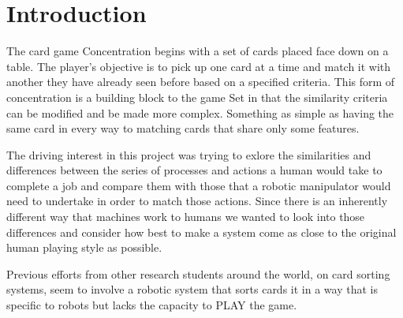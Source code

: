 \section{Introduction}

The card game Concentration begins with a set of cards placed face down on a table. The player's objective is to pick up one card at a time and match it with another they have already seen before based on a specified criteria. This form of concentration is a building block to the game Set in that the similarity criteria can be modified and be made more complex. Something as simple as having the same card in every way to matching cards that share only some features.

The driving interest in this project was trying to exlore the similarities and differences between the series of processes and actions a human would take to complete a job and compare them with those that a robotic manipulator would need to undertake in order to match those actions. Since there is an inherently different way that machines work to humans we wanted to look into those differences and consider how best to make a system come as close to the original human playing style as possible.

Previous efforts from other research students around the world, on card sorting systems, seem to involve a robotic system that sorts cards it in a way that is specific to robots but lacks the capacity to PLAY the game.